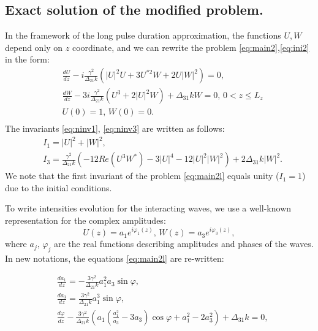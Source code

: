 \documentclass[a4paper, 12pt, onecolumn]{extarticle}
\begin{document}
\subsection*{Exact solution of the modified problem.}
In the framework of the long pulse duration approximation, the functions \(U,W\) depend only on \(z\) coordinate, and we can rewrite the problem \eqref{eq:main2},\eqref{eq:ini2} in the form:
\begin{equation}
\label{eq:main2l}
\begin{aligned}
&\frac{dU}{dz}-i\frac{\gamma^2}{\Delta_{21} k}(|U|^2U+3U^{*2}W+2U|W|^2)=0,\\
&\frac{dW}{dz}-3i\frac{\gamma^2}{\Delta_{21} k}(U^3+2|U|^2W)+\Delta_{31}kW=0,\,  0< z \leq L_z\\
&U(0)=1,\,W(0)=0.\\
\end{aligned}
\end{equation}
The invariants \eqref{eq:ninv1}, \eqref{eq:ninv3} are written as follows:
\begin{equation}
\label{eq:ninvs}
\begin{aligned}
&I_1=|U|^2+|W|^2,\\
&I_3=\frac{\gamma^2}{\Delta_{21}k}\left(-12Re(U^3W^*)-3|U|^4-12|U|^2|W|^2\right)+2\Delta_{31}k|W|^2.
\end{aligned}
\end{equation}
We note that the first invariant of the problem \eqref{eq:main2l} equals unity (\(I_1=1\)) due to the initial conditions.

To write intensities evolution for the interacting waves, we use a well-known representation for the complex amplitudes:
\begin{equation}
\label{eq:repr}
U(z)=a_1e^{i\varphi_1(z)},\,W(z)=a_3e^{i\varphi_3(z)},
\end{equation}
where \(a_j,\,\varphi_j\) are the real functions describing amplitudes and phases of the waves. In new notations, the equations \eqref{eq:main2l} are re-written:

\begin{equation}
\label{eq:main3}
\begin{aligned}
&\frac{da_1}{dz}=-\frac{3\gamma^2}{\Delta_{21}k}a_1^2a_3\sin\varphi,\\
&\frac{da_3}{dz}=\frac{3\gamma^2}{\Delta_{21}k}a_1^3\sin\varphi,\\
&\frac{d\varphi}{dz}-\frac{3 \gamma^2}{\Delta_{21}k}\left(a_1  \left(\frac{a_1^2}{a_3}-3a_3\right)\cos\varphi+a_1^2-2a_3^2\right)+\Delta_{31}k=0,
\end{aligned}
\end{equation}
\end{document}
